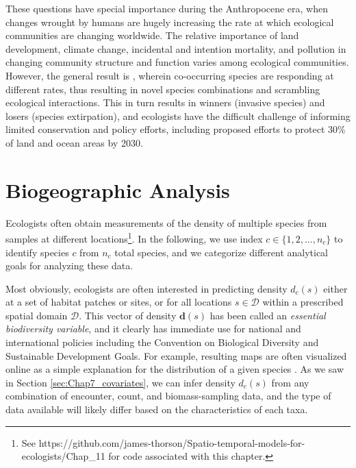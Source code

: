 These questions have special importance during the Anthropocene era, when changes wrought by humans are hugely increasing the rate at which ecological communities are changing worldwide.  The relative importance of land development, climate change, incidental and intention mortality, and pollution in changing community structure and function varies among ecological communities.  However, the general result is , wherein co-occurring species are responding at different rates, thus resulting in novel species combinations and scrambling ecological interactions.  This in turn results in winners (invasive species) and losers (species extirpation), and ecologists have the difficult challenge of informing limited conservation and policy efforts, including proposed efforts to protect 30\% of land and ocean areas by 2030.   

\section{Biogeographic Analysis}

Ecologists often obtain measurements of the density of multiple species from samples at different locations\footnote{See https://github.com/james-thorson/Spatio-temporal-models-for-ecologists/Chap\_11 for code associated with this chapter.}.  In the following, we use index \(c \in \{1,2,...,n_c\} \) to identify species \(c\) from \(n_c\) total species, and we categorize different analytical goals for analyzing these data.

Most obviously, ecologists are often interested in predicting density \(d_c(s)\) either at a set of habitat patches or sites, or for all locations \(s \in \mathcal{D} \) within a prescribed spatial domain \(\mathcal{D}\).  This vector of density \(\mathbf{d}(s)\) has been called an \textit{essential biodiversity variable}, and it clearly has immediate use for national and international policies including the Convention on Biological Diversity and Sustainable Development Goals.  For example, resulting maps are often visualized online as a simple explanation for the distribution of a given species \cite{jetz_essential_2019}. As we saw in Section \ref{sec:Chap7_covariates}, we can infer density \(d_c(s)\) from any combination of encounter, count, and biomass-sampling data, and the type of data available will likely differ based on the characteristics of each taxa.  

